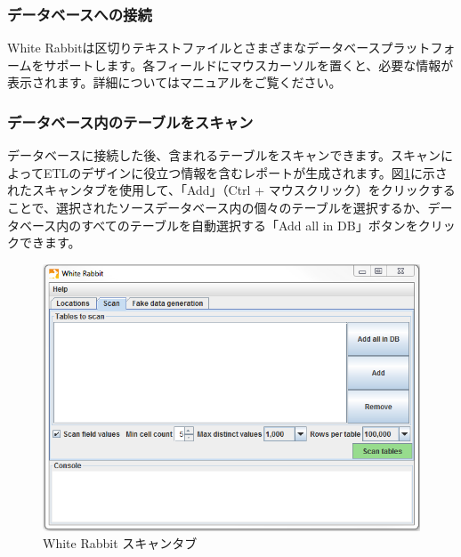 \documentclass[
  11pt]{book}
\theoremstyle{definition}
\theoremstyle{definition}
\theoremstyle{definition}
\theoremstyle{definition}
\theoremstyle{remark}
\begin{document}
\subsubsection*{データベースへの接続}\label{ux30c7ux30fcux30bfux30d9ux30fcux30b9ux3078ux306eux63a5ux7d9a}

White Rabbitは区切りテキストファイルとさまざまなデータベースプラットフォームをサポートします。各フィールドにマウスカーソルを置くと、必要な情報が表示されます。詳細についてはマニュアルをご覧ください。

\subsubsection*{データベース内のテーブルをスキャン}\label{ux30c7ux30fcux30bfux30d9ux30fcux30b9ux5185ux306eux30c6ux30fcux30d6ux30ebux3092ux30b9ux30adux30e3ux30f3}

データベースに接続した後、含まれるテーブルをスキャンできます。スキャンによってETLのデザインに役立つ情報を含むレポートが生成されます。図\ref{fig:WhiteRabbitAddTables}に示されたスキャンタブを使用して、「Add」（Ctrl + マウスクリック）をクリックすることで、選択されたソースデータベース内の個々のテーブルを選択するか、データベース内のすべてのテーブルを自動選択する「Add all in DB」ボタンをクリックできます。

\begin{figure}

{\centering \includegraphics[width=1\linewidth]{images/ExtractTransformLoad/WhiteRabbitAddTables} 

}

\caption{White Rabbit スキャンタブ}\label{fig:WhiteRabbitAddTables}
\end{figure}
\end{document}
